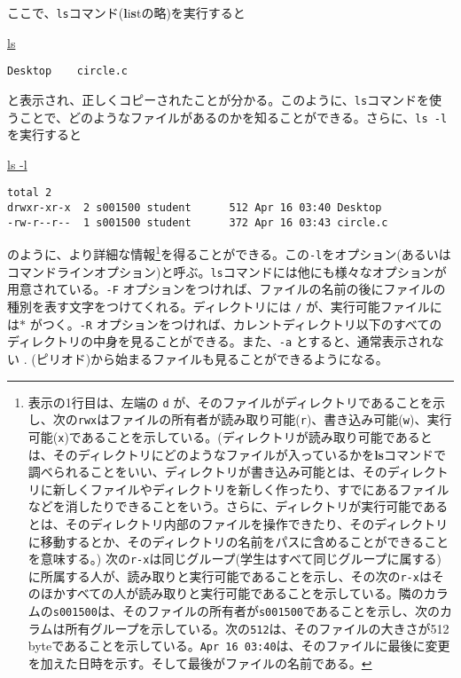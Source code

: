 ここで、{\tt ls}コマンド({\bf l}i{\bf s}tの略)を実行すると
\begin{commandline2}
\prompt \underline{ls}
\vspace*{-.8em} 
\begin{verbatim}
Desktop    circle.c
\end{verbatim}
\end{commandline2} \noindent
と表示され、正しくコピーされたことが分かる。このように、{\tt ls}コマンドを使うことで、どのようなファイルがあるのかを知ることができる。さらに、{\tt ls -l}を実行すると
\begin{commandline2}
\prompt \underline{ls -l}
\vspace*{-.8em} 
\begin{verbatim}
total 2
drwxr-xr-x  2 s001500 student      512 Apr 16 03:40 Desktop
-rw-r--r--  1 s001500 student      372 Apr 16 03:43 circle.c
\end{verbatim}
\end{commandline2} \noindent
のように、より詳細な情報\footnote{表示の1行目は、左端の {\tt d} が、そのファイルがディレクトリであることを示し、次の{\tt rwx}はファイルの所有者が読み取り可能({\tt r})、書き込み可能({\tt w})、実行可能({\tt x})であることを示している。(ディレクトリが読み取り可能であるとは、そのディレクトリにどのようなファイルが入っているかを{\bf ls}コマンドで調べられることをいい、ディレクトリが書き込み可能とは、そのディレクトリに新しくファイルやディレクトリを新しく作ったり、すでにあるファイルなどを消したりできることをいう。さらに、ディレクトリが実行可能であるとは、そのディレクトリ内部のファイルを操作できたり、そのディレクトリに移動するとか、そのディレクトリの名前をパスに含めることができることを意味する。) 次の{\tt r-x}は同じグループ(学生はすべて同じグループに属する)に所属する人が、読み取りと実行可能であることを示し、その次の{\tt r-x}はそのほかすべての人が読み取りと実行可能であることを示している。隣のカラムの{\tt s001500}は、そのファイルの所有者が{\tt s001500}であることを示し、次のカラムは所有グループを示している。次の{\tt 512}は、そのファイルの大きさが512 byteであることを示している。{\tt Apr 16 03:40}は、そのファイルに最後に変更を加えた日時を示す。そして最後がファイルの名前である。}を得ることができる。この{\tt -l}をオプション(あるいはコマンドラインオプション)と呼ぶ。{\tt ls}コマンドには他にも様々なオプションが用意されている。{\tt -F} オプションをつければ、ファイルの名前の後にファイルの種別を表す文字をつけてくれる。ディレクトリには {\tt /} が、実行可能ファイルには{\tt $ \ast$} がつく。{\tt -R} オプションをつければ、カレントディレクトリ以下のすべてのディレクトリの中身を見ることができる。また、{\tt -a} とすると、通常表示されない . (ピリオド)から始まるファイルも見ることができるようになる。

